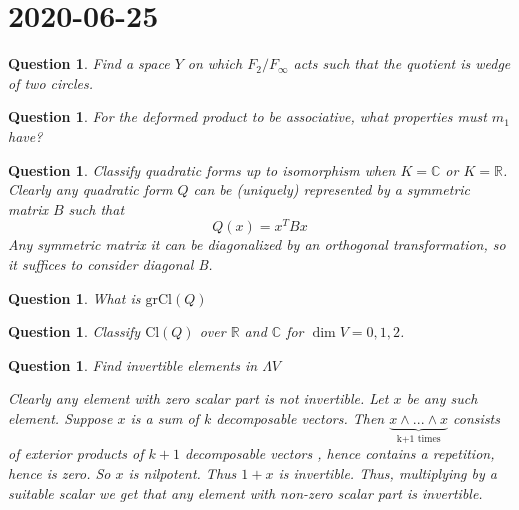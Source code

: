 \documentclass[a4paper]{article}
\newtheorem{que}[thm]{Question}
\begin{document}
\section*{ 2020-06-25}

\begin{que} Find a space $Y$ on which $F_2/F_\infty$ acts such that the quotient is wedge of two circles.

\end{que} 
\begin{que} For the deformed product to be associative, what properties must $m_1$ have?
	
	
\end{que}
\begin{que} Classify quadratic forms up to isomorphism when $K = \mathbb{C}$ or $K = \mathbb{R}$. 
	Clearly any quadratic form $Q$ can be (uniquely) represented by a symmetric matrix $B$ such that
	$$Q(x) = x^T B x$$
	Any symmetric matrix it can be diagonalized by an orthogonal transformation, so it suffices to consider diagonal B. 
\end{que}
\begin{que} What is $\text{gr}  \text{Cl}(Q)$
\end{que}
\begin{que} Classify $ \text{Cl}(Q)$ over $\mathbb{R}$ and $\mathbb{C}$ for $\dim V = 0, 1, 2$.

\end{que}
\begin{que} Find invertible elements in $\Lambda V$
	
	Clearly any element with zero scalar part is not invertible. Let $x$ be any such element. Suppose $x$ is a sum of $k$ decomposable vectors. Then $\underbrace{x \wedge ... \wedge x}_\text{k+1 times}$ consists of exterior products of $k+1$ decomposable vectors , hence contains a repetition, hence is zero. So $x$ is nilpotent. Thus $1+x$ is invertible. Thus, multiplying by a suitable scalar we get that any element with non-zero scalar part is invertible.
	
\end{que}
\end{document}
